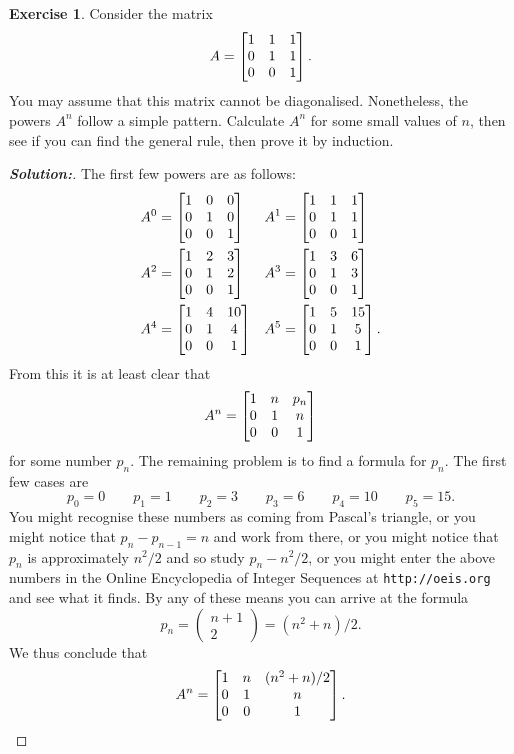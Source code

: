 \documentclass[a4paper]{amsart}
\theoremstyle{definition}
\newtheorem{exercise}{Exercise}
\newenvironment{solution}{\begin{proof}[\textbf{Solution:}] \vphantom{u}}{\end{proof}}
\begin{document}
\begin{exercise}\label{ex-powers-iii}
 Consider the matrix 
 \[ A = \left[\begin{matrix} 1&1&1 \\ 0&1&1 \\ 0&0&1 \end{matrix}\right]. \]
 You may assume that this matrix cannot be diagonalised.  Nonetheless,
 the powers $A^n$ follow a simple pattern.  Calculate $A^n$ for some
 small values of $n$, then see if you can find the general rule, then
 prove it by induction.
\end{exercise}
\begin{solution}
 The first few powers are as follows:
 \begin{align*}
  A^0 &= \left[\begin{matrix} 1&0& 0 \\ 0&1&0 \\ 0&0&1 \end{matrix}\right] &
  A^1 &= \left[\begin{matrix} 1&1& 1 \\ 0&1&1 \\ 0&0&1 \end{matrix}\right] \\
  A^2 &= \left[\begin{matrix} 1&2& 3 \\ 0&1&2 \\ 0&0&1 \end{matrix}\right] &
  A^3 &= \left[\begin{matrix} 1&3& 6 \\ 0&1&3 \\ 0&0&1 \end{matrix}\right] \\
  A^4 &= \left[\begin{matrix} 1&4&10 \\ 0&1&4 \\ 0&0&1 \end{matrix}\right] &
  A^5 &= \left[\begin{matrix} 1&5&15 \\ 0&1&5 \\ 0&0&1 \end{matrix}\right].
 \end{align*}
 From this it is at least clear that 
 \[ A^n = \left[\begin{matrix} 1 & n & p_n \\ 0 & 1 & n \\ 0 & 0 & 1 \end{matrix}\right] \]
 for some number $p_n$.  The remaining problem is to find a formula
 for $p_n$.  The first few cases are 
 \[ p_0 = 0  \qquad
    p_1 = 1  \qquad
    p_2 = 3  \qquad
    p_3 = 6  \qquad
    p_4 = 10 \qquad
    p_5 = 15. 
 \]
 You might recognise these numbers as coming from Pascal's triangle,
 or you might notice that $p_n-p_{n-1}=n$ and work from there, or you
 might notice that $p_n$ is approximately $n^2/2$ and so study
 $p_n-n^2/2$, or you might enter the above numbers in the Online
 Encyclopedia of Integer Sequences at \verb+http://oeis.org+ and see
 what it finds.  By any of these means you can arrive at the formula 
 \[ p_n = \left(\begin{array}{c} n+1 \\ 2 \end{array}\right) 
        = (n^2+n)/2.
 \] 
 We thus conclude that
 \[ A^n = \left[\begin{matrix} 1 & n & (n^2+n)/2 \\ 0 & 1 & n \\ 0 & 0 & 1 \end{matrix}\right]. \]

\end{solution}
\end{document}
